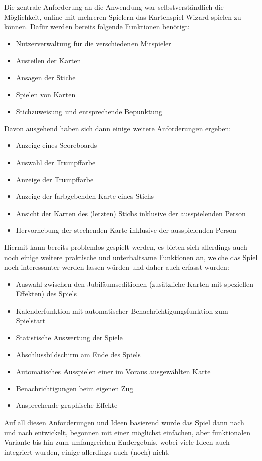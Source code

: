 Die zentrale Anforderung an die Anwendung war selbstverständlich die Möglichkeit, online mit mehreren Spielern das Kartenspiel Wizard spielen zu können. Dafür werden bereits folgende Funktionen benötigt:
\begin{itemize}
	\item Nutzerverwaltung für die verschiedenen Mitspieler
	\item Austeilen der Karten
	\item Ansagen der Stiche
	\item Spielen von Karten
	\item Stichzuweisung und entsprechende Bepunktung
\end{itemize}
Davon ausgehend haben sich dann einige weitere Anforderungen ergeben:
\begin{itemize}
	\item Anzeige eines Scoreboards
	\item Auswahl der Trumpffarbe
	\item Anzeige der Trumpffarbe
	\item Anzeige der farbgebenden Karte eines Stichs
	\item Ansicht der Karten des (letzten) Stichs inklusive der ausspielenden Person
	\item Hervorhebung der stechenden Karte inklusive der ausspielenden Person
\end{itemize}
Hiermit kann bereits problemlos gespielt werden, es bieten sich allerdings auch noch einige weitere praktische und unterhaltsame Funktionen an, welche das Spiel noch interessanter werden lassen würden und daher auch erfasst wurden:
\begin{itemize}
	\item Auswahl zwischen den Jubiläumseditionen (zusätzliche Karten mit speziellen Effekten) des Spiels
	\item Kalenderfunktion mit automatischer Benachrichtigungsfunktion zum Spielstart
	\item Statistische Auswertung der Spiele
	\item Abschlussbildschirm am Ende des Spiels
	\item Automatisches Ausspielen einer im Voraus ausgewählten Karte
	\item Benachrichtigungen beim eigenen Zug
	\item Ansprechende graphische Effekte
\end{itemize}
Auf all diesen Anforderungen und Ideen basierend wurde das Spiel dann nach und nach entwickelt, begonnen mit einer möglichst einfachen, aber funktionalen Variante bis hin zum umfangreichen Endergebnis, wobei viele Ideen auch integriert wurden, einige allerdings auch (noch) nicht.

